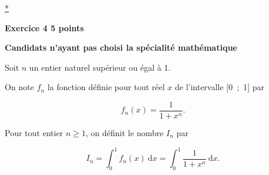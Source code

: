 \documentclass[10pt]{article}
\begin{document}
\hyperlink{Index}{*}

\vspace{0,5cm}

\textbf{Exercice 4 \hfill 5 points}

\textbf{Candidats n'ayant pas choisi la spécialité mathématique}

\medskip

Soit $n$ un entier naturel supérieur ou égal à 1.
 
On note $f_{n}$ la fonction définie pour tout réel $x$ de l'intervalle [0~;~1] par 

\[f_{n}(x) = \dfrac{1}{1 + x^n}.\] 

Pour tout entier $n \geqslant 1$, on définit le nombre $I_{n}$ par 

\[I_{n} = \int_{0}^1 f_{n}(x)\:\text{d}x = \int_{0}^1 \dfrac{1}{1 + x^n}\:\text{d}x.\] 
 
\end{document}
